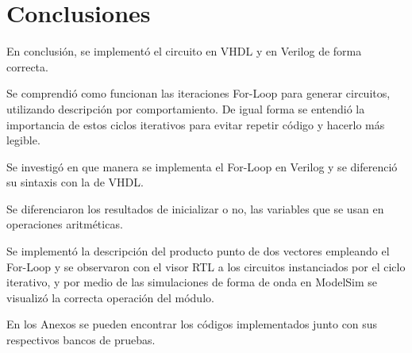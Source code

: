 \section{Conclusiones}
En conclusión, se implementó el circuito en VHDL y en Verilog de forma correcta.

Se comprendió como funcionan las iteraciones For-Loop para generar circuitos, utilizando descripción por comportamiento. De igual forma se entendió la importancia de estos ciclos iterativos para evitar repetir código y hacerlo más legible.

Se investigó en que manera se implementa el For-Loop en Verilog y se diferenció su sintaxis con la de VHDL.

Se diferenciaron los resultados de inicializar o no, las variables que se usan en operaciones aritméticas.

Se implementó la descripción del producto punto de dos vectores empleando el For-Loop y se observaron con el visor RTL a los circuitos instanciados por el ciclo iterativo, y por medio de las simulaciones de forma de onda en ModelSim se visualizó la correcta operación del módulo.

En los Anexos se pueden encontrar los códigos implementados junto con sus respectivos bancos de pruebas. 